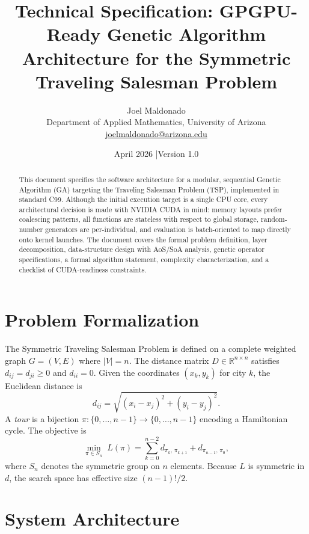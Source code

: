 \documentclass[11pt, letterpaper]{article}
\title{%
  \textbf{Technical Specification: GPGPU-Ready Genetic Algorithm}\\[0.4em]
  \large Architecture for the Symmetric Traveling Salesman Problem
}
\author{%
  Joel Maldonado\\
  \small Department of Applied Mathematics, University of Arizona\\
  \small \href{mailto:joelmaldonado@arizona.edu}{joelmaldonado@arizona.edu}
}
\date{April 2026 \quad|\quad Version 1.0}
\begin{document}
\maketitle
\thispagestyle{fancy}

\begin{abstract}
This document specifies the software architecture for a modular, sequential Genetic
Algorithm (GA) targeting the Traveling Salesman Problem (TSP), implemented in
standard C99.  Although the initial execution target is a single CPU core, every
architectural decision is made with NVIDIA CUDA in mind: memory layouts prefer
coalescing patterns, all functions are stateless with respect to global storage,
random-number generators are per-individual, and evaluation is batch-oriented to
map directly onto kernel launches.  The document covers the formal problem
definition, layer decomposition, data-structure design with AoS/SoA analysis,
genetic operator specifications, a formal algorithm statement, complexity
characterization, and a checklist of CUDA-readiness constraints.
\end{abstract}

\tableofcontents
\bigskip

\section{Problem Formalization}

The Symmetric Traveling Salesman Problem is defined on a complete weighted graph
$G = (V, E)$ where $|V| = n$.  The distance matrix $D \in \mathbb{R}^{n \times n}$
satisfies $d_{ij} = d_{ji} \geq 0$ and $d_{ii} = 0$.  Given the coordinates
$(x_k, y_k)$ for city $k$, the Euclidean distance is
\[
  d_{ij} = \sqrt{(x_i - x_j)^2 + (y_i - y_j)^2}.
\]
A \emph{tour} is a bijection $\pi: \{0,\dots,n-1\} \to \{0,\dots,n-1\}$ encoding
a Hamiltonian cycle.  The objective is
\begin{equation}
  \min_{\pi \in S_n}\; L(\pi)
  = \sum_{k=0}^{n-2} d_{\pi_k,\,\pi_{k+1}} + d_{\pi_{n-1},\,\pi_0},
  \label{eq:objective}
\end{equation}
where $S_n$ denotes the symmetric group on $n$ elements.  Because $L$ is
symmetric in $d$, the search space has effective size $(n-1)!/2$.

\section{System Architecture}
\end{document}
